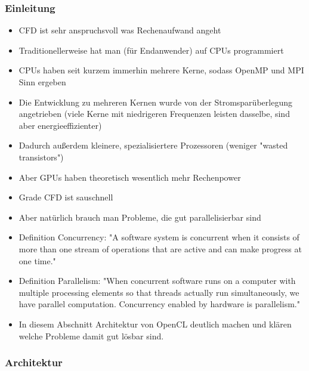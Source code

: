 \subsubsection{Einleitung}

\begin{itemize}
\item CFD ist sehr anspruchsvoll was Rechenaufwand angeht
\item Traditionellerweise hat man (für Endanwender) auf CPUs programmiert
\item CPUs haben seit kurzem immerhin mehrere Kerne, sodass OpenMP und MPI Sinn ergeben
\item Die Entwicklung zu mehreren Kernen wurde von der Stromsparüberlegung angetrieben (viele Kerne mit niedrigeren Frequenzen leisten dasselbe, sind aber energieeffizienter)
\item Dadurch außerdem kleinere, spezialisiertere Prozessoren (weniger "wasted transistors")
\item Aber GPUs haben theoretisch wesentlich mehr Rechenpower\cite{Guide2012}
\item Grade CFD ist sauschnell
\item Aber natürlich brauch man Probleme, die gut parallelisierbar sind
\item Definition Concurrency: "A software system is concurrent when it consists of more than one stream of operations that are active and can make progress at one time."
\item Definition Parallelism: "When concurrent software runs on a computer with multiple processing elements so that threads actually run simultaneously, we have parallel computation. Concurrency enabled by hardware is parallelism."
\item In diesem Abschnitt Architektur von OpenCL deutlich machen und klären welche Probleme damit gut lösbar sind.
\end{itemize}

\subsubsection{Architektur}

